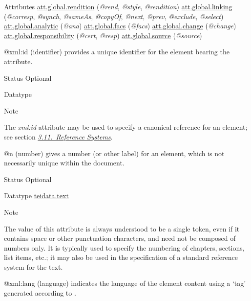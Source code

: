 \begin{reflist}
    \item[{Attributes}]
  \hyperref[TEI.att.global.rendition]{att.global.rendition} (\textit{@rend}, \textit{@style}, \textit{@rendition}) \hyperref[TEI.att.global.linking]{att.global.linking} (\textit{@corresp}, \textit{@synch}, \textit{@sameAs}, \textit{@copyOf}, \textit{@next}, \textit{@prev}, \textit{@exclude}, \textit{@select}) \hyperref[TEI.att.global.analytic]{att.global.analytic} (\textit{@ana}) \hyperref[TEI.att.global.facs]{att.global.facs} (\textit{@facs}) \hyperref[TEI.att.global.change]{att.global.change} (\textit{@change}) \hyperref[TEI.att.global.responsibility]{att.global.responsibility} (\textit{@cert}, \textit{@resp}) \hyperref[TEI.att.global.source]{att.global.source} (\textit{@source}) \hfil\\[-10pt]\begin{sansreflist}
    \item[@xml:id]
  (identifier) provides a unique identifier for the element bearing the attribute.
\begin{reflist}
    \item[{Status}]
  Optional
    \item[{Datatype}]
    \item[{Note}]
  \par
The {\itshape xml:id} attribute may be used to specify a canonical reference for an element; see section \textit{\hyperref[CORS]{3.11.\ Reference Systems}}.
\end{reflist}  
    \item[@n]
  (number) gives a number (or other label) for an element, which is not necessarily unique within the document.
\begin{reflist}
    \item[{Status}]
  Optional
    \item[{Datatype}]
  \hyperref[TEI.teidata.text]{teidata.text}
    \item[{Note}]
  \par
The value of this attribute is always understood to be a single token, even if it contains space or other punctuation characters, and need not be composed of numbers only. It is typically used to specify the numbering of chapters, sections, list items, etc.; it may also be used in the specification of a standard reference system for the text.
\end{reflist}  
    \item[@xml:lang]
  (language) indicates the language of the element content using a ‘tag’ generated according to .

\end{sansreflist}
\end{reflist}
